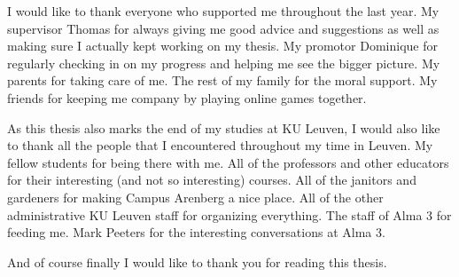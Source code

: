 \documentclass[master=cws,masteroption=vs]{kulemt}
\begin{document}
\begin{preface}
I would like to thank everyone who supported me throughout the last year.
My supervisor Thomas for always giving me good advice and suggestions as well as making sure I actually kept working on my thesis.
My promotor Dominique for regularly checking in on my progress and helping me see the bigger picture.
My parents for taking care of me.
The rest of my family for the moral support.
My friends for keeping me company by playing online games together.

As this thesis also marks the end of my studies at KU Leuven, I would also like to thank all the people that I encountered throughout my time in Leuven.
My fellow students for being there with me.
All of the professors and other educators for their interesting (and not so interesting) courses.
All of the janitors and gardeners for making Campus Arenberg a nice place.
All of the other administrative KU Leuven staff for organizing everything.
The staff of Alma 3 for feeding me.
Mark Peeters for the interesting conversations at Alma 3.

And of course finally I would like to thank you for reading this thesis.
\end{preface}

\tableofcontents*
\end{document}
